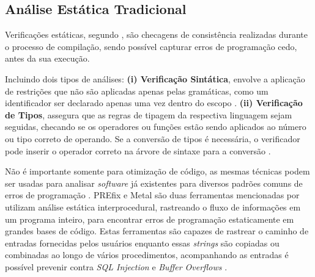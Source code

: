 \documentclass[
    12pt,                %
    openright,           %
    oneside,             %
    a4paper,             %
    english,             %
    brazil               %
]{abntex2}
\begin{document}
\subsection{Análise Estática Tradicional}
\label{sec:analisetradicional}
\par
Verificações estáticas, segundo , são checagens de consistência realizadas durante o processo de compilação, sendo possível capturar erros de programação cedo, antes da sua execução. 
\par
Incluindo dois tipos de análises: 
\textbf{(i) Verificação Sintática}, envolve a aplicação de restrições que não são aplicadas apenas pelas gramáticas, como um identificador ser declarado apenas uma vez dentro do escopo \cite{aho2007compilers}.
\textbf{(ii) Verificação de Tipos}, assegura que as regras de tipagem da respectiva linguagem sejam seguidas, checando se os operadores ou funções estão sendo aplicados ao número ou tipo correto de operando.
Se a conversão de tipos é necessária, o verificador pode inserir o operador correto na árvore de sintaxe para a conversão \cite{aho2007compilers}.
\par
Não é importante somente para otimização de código, as mesmas técnicas podem ser usadas para analisar \textit{software} já existentes para diversos padrões comuns de erros de programação \cite{aho2007compilers}.
PREfix e Metal são duas ferramentas mencionadas por  utilizam análise estática interprocedural, rastreando o fluxo de informações em um programa inteiro, para encontrar erros de programação estaticamente em grandes bases de código.
Estas ferramentas são capazes de rastrear o caminho de entradas fornecidas pelos usuários enquanto essas \textit{strings} são copiadas ou combinadas ao longo de vários procedimentos, acompanhando as entradas é possível prevenir contra \textit{SQL Injection} e \textit{Buffer Overflows} \cite{aho2007compilers}.
\end{document}
